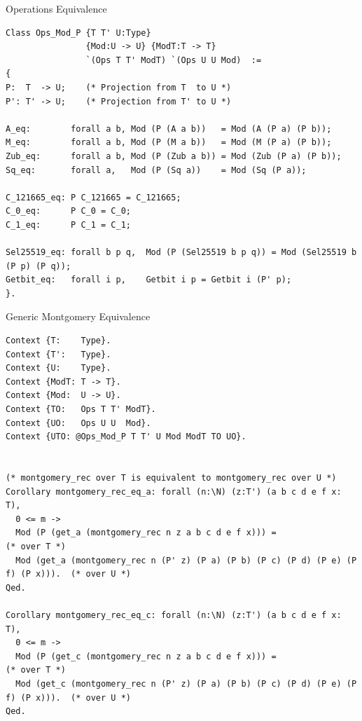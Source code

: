 \documentclass[8pt]{beamer}
\begin{document}
\begin{frame}[fragile]{Operations Equivalence}
\begin{center}

\begin{lstlisting}[language=Coq]
Class Ops_Mod_P {T T' U:Type}
                {Mod:U -> U} {ModT:T -> T}
                `(Ops T T' ModT) `(Ops U U Mod)  :=
{
P:  T  -> U;    (* Projection from T  to U *)
P': T' -> U;    (* Projection from T' to U *)

A_eq:        forall a b, Mod (P (A a b))   = Mod (A (P a) (P b));
M_eq:        forall a b, Mod (P (M a b))   = Mod (M (P a) (P b));
Zub_eq:      forall a b, Mod (P (Zub a b)) = Mod (Zub (P a) (P b));
Sq_eq:       forall a,   Mod (P (Sq a))    = Mod (Sq (P a));

C_121665_eq: P C_121665 = C_121665;
C_0_eq:      P C_0 = C_0;
C_1_eq:      P C_1 = C_1;

Sel25519_eq: forall b p q,  Mod (P (Sel25519 b p q)) = Mod (Sel25519 b (P p) (P q));
Getbit_eq:   forall i p,    Getbit i p = Getbit i (P' p);
}.
\end{lstlisting}
\end{center}
\end{frame}


\begin{frame}[fragile]{Generic Montgomery Equivalence}
\begin{center}

\begin{lstlisting}[language=Coq]
Context {T:    Type}.
Context {T':   Type}.
Context {U:    Type}.
Context {ModT: T -> T}.
Context {Mod:  U -> U}.
Context {TO:   Ops T T' ModT}.
Context {UO:   Ops U U  Mod}.
Context {UTO: @Ops_Mod_P T T' U Mod ModT TO UO}.


(* montgomery_rec over T is equivalent to montgomery_rec over U *)
Corollary montgomery_rec_eq_a: forall (n:\N) (z:T') (a b c d e f x: T),
  0 <= m ->
  Mod (P (get_a (montgomery_rec n z a b c d e f x))) =                              (* over T *)
  Mod (get_a (montgomery_rec n (P' z) (P a) (P b) (P c) (P d) (P e) (P f) (P x))).  (* over U *)
Qed.

Corollary montgomery_rec_eq_c: forall (n:\N) (z:T') (a b c d e f x: T),
  0 <= m ->
  Mod (P (get_c (montgomery_rec n z a b c d e f x))) =                              (* over T *)
  Mod (get_c (montgomery_rec n (P' z) (P a) (P b) (P c) (P d) (P e) (P f) (P x))).  (* over U *)
Qed.
\end{lstlisting}
\end{center}
\end{frame}
\end{document}
